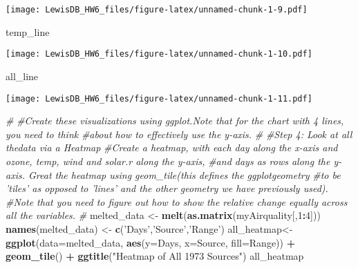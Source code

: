 \documentclass[]{article}
\newenvironment{Shaded}{\begin{snugshade}}{\end{snugshade}}
\newcommand{\KeywordTok}[1]{\textcolor[rgb]{0.13,0.29,0.53}{\textbf{#1}}}
\newcommand{\DataTypeTok}[1]{\textcolor[rgb]{0.13,0.29,0.53}{#1}}
\newcommand{\DecValTok}[1]{\textcolor[rgb]{0.00,0.00,0.81}{#1}}
\newcommand{\StringTok}[1]{\textcolor[rgb]{0.31,0.60,0.02}{#1}}
\newcommand{\CommentTok}[1]{\textcolor[rgb]{0.56,0.35,0.01}{\textit{#1}}}
\newcommand{\OperatorTok}[1]{\textcolor[rgb]{0.81,0.36,0.00}{\textbf{#1}}}
\newcommand{\NormalTok}[1]{#1}
\begin{document}
\texttt{[image: LewisDB\_HW6\_files/figure-latex/unnamed-chunk-1-9.pdf]}

\begin{Shaded}
\begin{Highlighting}[]
\NormalTok{temp_line}
\end{Highlighting}
\end{Shaded}

\texttt{[image: LewisDB\_HW6\_files/figure-latex/unnamed-chunk-1-10.pdf]}

\begin{Shaded}
\begin{Highlighting}[]
\NormalTok{all_line}
\end{Highlighting}
\end{Shaded}

\texttt{[image: LewisDB\_HW6\_files/figure-latex/unnamed-chunk-1-11.pdf]}

\begin{Shaded}
\begin{Highlighting}[]
\CommentTok{#}
\CommentTok{#Create these visualizations using ggplot.Note that for the chart with 4 lines, you need to think}
\CommentTok{#about how to effectively use the y-axis.}
\CommentTok{#}
\CommentTok{#Step 4: Look at all thedata via a Heatmap}
\CommentTok{#Create a heatmap, with each day along the x-axis and ozone, temp, wind and solar.r along the y-axis,}
\CommentTok{#and days as rows along the y-axis. Great the heatmap using geom_tile(this defines the ggplotgeometry}
\CommentTok{#to be 'tiles' as opposed to 'lines' and the other geometry we have previously used).}
\CommentTok{#Note that you need to figure out how to show the relative change equally across all the variables.}
\CommentTok{#}
\NormalTok{melted_data <-}\StringTok{ }\KeywordTok{melt}\NormalTok{(}\KeywordTok{as.matrix}\NormalTok{(myAirquality[,}\DecValTok{1}\OperatorTok{:}\DecValTok{4}\NormalTok{]))}
\KeywordTok{names}\NormalTok{(melted_data) <-}\StringTok{ }\KeywordTok{c}\NormalTok{(}\StringTok{'Days'}\NormalTok{,}\StringTok{'Source'}\NormalTok{,}\StringTok{'Range'}\NormalTok{)}
\NormalTok{all_heatmap<-}\KeywordTok{ggplot}\NormalTok{(}\DataTypeTok{data=}\NormalTok{melted_data, }\KeywordTok{aes}\NormalTok{(}\DataTypeTok{y=}\NormalTok{Days, }\DataTypeTok{x=}\NormalTok{Source, }\DataTypeTok{fill=}\NormalTok{Range)) }\OperatorTok{+}\StringTok{ }\KeywordTok{geom_tile}\NormalTok{() }\OperatorTok{+}\StringTok{ }\KeywordTok{ggtitle}\NormalTok{(}\StringTok{"Heatmap of All 1973 Sources"}\NormalTok{)}
\NormalTok{all_heatmap}
\end{Highlighting}
\end{Shaded}
\end{document}
